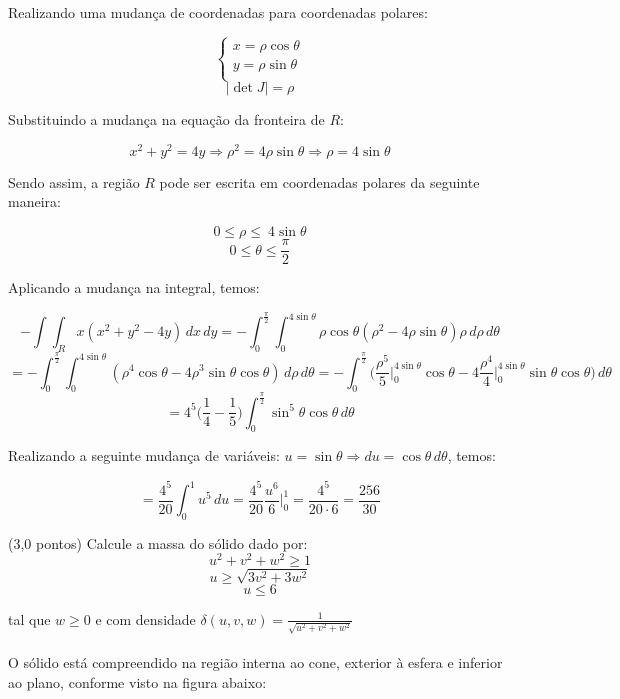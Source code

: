\documentclass[12pt,a4paper]{article}
\begin{document}
Realizando uma mudança de coordenadas para coordenadas polares:

$$
\left\{
\begin{array}{lc}
x = \rho \cos \theta\\
y = \rho \sin \theta \\
\end{array}
\right.
$$
$$ | \det J | = \rho $$

Substituindo a mudança na equação da fronteira de $R$:

$$ x^2 + y^2 = 4y \Rightarrow \rho^2 = 4 \rho \sin \theta \Rightarrow \rho = 4 \sin \theta $$

Sendo assim, a região $R$ pode ser escrita em coordenadas polares da seguinte maneira:

$$ 0 \leq \rho \leq  \ 4 \sin \theta $$
$$ 0 \leq \theta \leq \frac{\pi}{2} $$

Aplicando a mudança na integral, temos:


$$- \int \int_R x (x^2 + y^2 - 4y) \,dx \,dy  = - \int_0^{\frac{\pi}{2}} \int_0^{4 \sin \theta} \rho \cos \theta ( \rho^2 - 4 \rho \sin \theta ) \rho \,d\rho
 \,d\theta $$
 $$ =  - \int_0^{\frac{\pi}{2}} \int_0^{4 \sin \theta} ( \rho^4 \cos \theta - 4 \rho^3 \sin \theta \cos \theta ) \,d\rho
 \,d\theta = - \int_0^{\frac{\pi}{2}}  \Big( \frac{\rho^5}{5} \Big|_0^{4 \sin \theta} \cos \theta - 4 \frac{\rho^4}{4} \Big|_0^{4 \sin \theta} \sin \theta \cos \theta \Big) 
 \,d\theta  $$
 $$ = 4^5 \Big( \frac{1}{4} - \frac{1}{5} \Big) \int_0^{\frac{\pi}{2}} \sin^5 \theta \cos \theta \,d\theta  $$
 
 Realizando a seguinte mudança de variáveis: $u = \sin \theta \Rightarrow du = \cos \theta \,d\theta $, temos:
 
$$ = \frac{4^5}{20} \int_0^1 u^5 \,du = \frac{4^5}{20} \frac{u^6}{6} \Big|_0^1 = \frac{4^5}{20 \cdot 6} = \frac{256}{30}$$

\newpage
{}
(3,0 pontos) Calcule a massa do sólido dado por:
$$u^2+v^2+w^2 \geq 1$$
$$u \geq \sqrt{3v^2+3w^2}$$
$$u\leq 6$$

tal que $w\geq 0$ e com densidade $\displaystyle{\delta(u,v,w)=\frac{1}{\sqrt{u^2+v^2+w^2}}}$\\
\\

O sólido está compreendido na região interna ao cone, exterior à esfera e inferior ao plano, conforme visto na figura abaixo:
\end{document}
